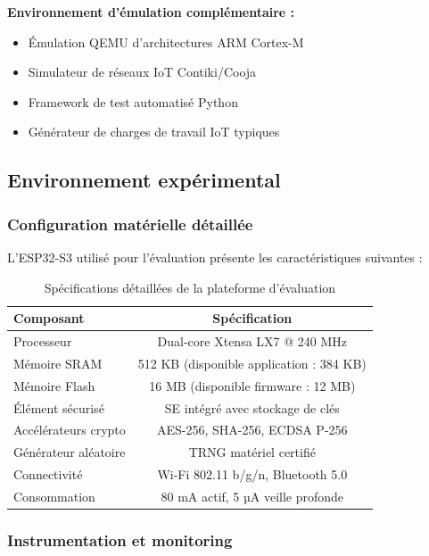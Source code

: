 \textbf{Environnement d'émulation complémentaire :}
\begin{itemize}
    \item Émulation QEMU d'architectures ARM Cortex-M
    \item Simulateur de réseaux IoT Contiki/Cooja
    \item Framework de test automatisé Python
    \item Générateur de charges de travail IoT typiques
\end{itemize}

\subsection{Environnement expérimental}

\subsubsection{Configuration matérielle détaillée}

L'ESP32-S3 utilisé pour l'évaluation présente les caractéristiques suivantes :

\begin{table}[h]
\centering
\caption{Spécifications détaillées de la plateforme d'évaluation}
\label{tab:hardware-specs}
\begin{tabular}{|l|c|}
\hline
\textbf{Composant} & \textbf{Spécification} \\
\hline
Processeur & Dual-core Xtensa LX7 @ 240 MHz \\
Mémoire SRAM & 512 KB (disponible application : 384 KB) \\
Mémoire Flash & 16 MB (disponible firmware : 12 MB) \\
Élément sécurisé & SE intégré avec stockage de clés \\
Accélérateurs crypto & AES-256, SHA-256, ECDSA P-256 \\
Générateur aléatoire & TRNG matériel certifié \\
Connectivité & Wi-Fi 802.11 b/g/n, Bluetooth 5.0 \\
Consommation & 80 mA actif, 5 µA veille profonde \\
\hline
\end{tabular}
\end{table}

\subsubsection{Instrumentation et monitoring}

